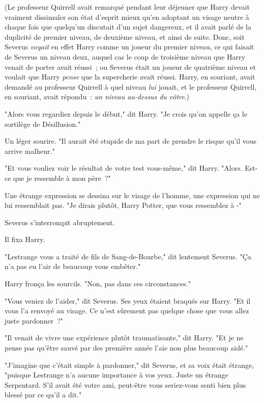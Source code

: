 (Le professeur Quirrell avait remarqué pendant leur déjeuner que Harry devait vraiment dissimuler son état d'esprit mieux qu'en adoptant un visage neutre à chaque fois que quelqu'un discutait d'un sujet dangereux, et il avait parlé de la duplicité de premier niveau, de deuxième niveau, et ainsi de suite. Donc, soit Severus \emph{voyait} en effet Harry comme un joueur du premier niveau, ce qui faisait de Severus un niveau deux, auquel cas le coup de troisième niveau que Harry venait de porter avait réussi~; ou Severus était un joueur de quatrième niveau et voulait que Harry \emph{pense} que la supercherie avait réussi. Harry, en souriant, avait demandé au professeur Quirrell à quel niveau \emph{lui} jouait, et le professeur Quirrell, en souriant, avait répondu~: \emph{un niveau au-dessus du vôtre}.)

"Alors vous regardiez depuis le début," dit Harry. "Je crois qu'on appelle ça le sortilège de Désillusion."

Un léger sourire. "Il aurait été stupide de ma part de prendre le risque qu'il vous arrive malheur."

"Et vous vouliez voir le résultat de votre test vous-même," dit Harry. "Alors. Est-ce que je ressemble à mon père~?"

Une étrange expression se dessina sur le visage de l'homme, une expression qui ne lui ressemblait pas. "Je dirais plutôt, Harry Potter, que vous ressemblez à -"

Severus s'interrompit abruptement.

Il fixa Harry.

"Lestrange vous a traité de fils de Sang-de-Bourbe," dit lentement Severus. "Ça n'a pas eu l'air de beaucoup vous embêter."

Harry fronça les sourcils. "Non, pas dans ces circonstances."

"Vous veniez de l'aider," dit Severus. Ses yeux étaient braqués sur Harry. "Et il vous l'a renvoyé au visage. Ce n'est sûrement pas quelque chose que vous allez juste pardonner~?"

"Il venait de vivre une expérience plutôt traumatisante," dit Harry. "Et je ne pense pas qu'être sauvé par des première année l'aie non plus beaucoup aidé."

"J'imagine que c'était simple à pardonner," dit Severus, et sa voix était étrange, "puisque Lestrange n'a aucune importance à vos yeux. Juste un étrange Serpentard. S'il avait été votre ami, peut-être vous seriez-vous senti bien plus blessé par ce qu'il a dit."


